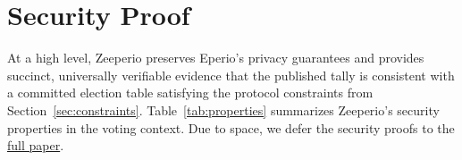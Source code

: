 



\section{Security Proof}
\label{sec:security}


At a high level, Zeeperio preserves Eperio's privacy guarantees and provides succinct,
universally verifiable evidence that the published tally is consistent with a committed election
table satisfying the protocol constraints from Section~\ref{sec:constraints}.
Table~\ref{tab:properties} summarizes Zeeperio's security properties in the voting context. Due to space, we defer the security proofs to the \href{https://eprint.iacr.org/2026/565.pdf}{full paper}.

